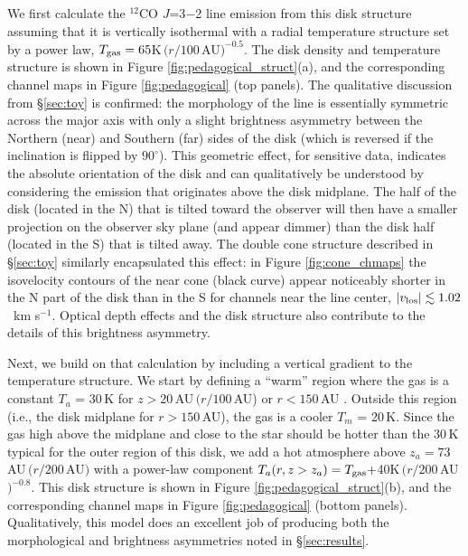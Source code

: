 We first calculate the $^{12}$CO $J$=3$-$2 line emission from this disk 
structure assuming that it is vertically isothermal with a radial temperature 
structure set by a power law, $T_{\rm gas} = 65$K\,$(r/100$\,AU$)^{-0.5}$.  The 
disk density and temperature structure is shown in Figure 
\ref{fig:pedagogical_struct}(a), and the corresponding channel maps in Figure 
\ref{fig:pedagogical} (top panels).  The qualitative discussion from 
\S\ref{sec:toy} is confirmed: the morphology of the line is essentially 
symmetric across the major axis with only a slight brightness asymmetry between 
the Northern (near) and Southern (far) sides of the disk (which is reversed if 
the inclination is flipped by $90^\circ$).  This geometric effect, for 
sensitive data, indicates the absolute orientation of the disk and can
qualitatively be understood by considering the emission that originates above 
the disk midplane.  The half of the disk (located in the N) that is tilted 
toward the observer will then have a smaller projection on the observer sky 
plane (and appear dimmer) than the disk half (located in the S) that is tilted 
away.  The double cone structure described in \S\ref{sec:toy} similarly
encapsulated this effect: in Figure \ref{fig:cone_chmaps} the isovelocity 
contours of the near cone (black curve) appear noticeably shorter in the N part
of the disk than in the S for channels near the line center, $|v_{\rm los}| 
\lesssim 1.02$\, km s$^{-1}$.  Optical depth effects and the disk
structure also contribute to the details of this brightness asymmetry.

Next, we build on that calculation by including a vertical gradient to the
temperature structure.  We start by defining a ``warm'' region where the gas is 
a constant $T_ a$ = 30\,K for $z > 20$\,AU\,$(r/100$\,AU) or $r < 150$\,AU 
\citep[the freezeout radius for this disk][]{qi11}.  Outside this 
region (i.e., the disk midplane for $r > 150$\,AU), the gas is a cooler 
$T_ m$ = 20\,K.  Since the gas high above the midplane and close to the star
should be hotter than the 30\,K typical for the outer region of this disk,
we add a hot atmosphere above $z_a = 73$AU\,$(r/200$\,AU$)$ with a power-law 
component $T_a(r,z>z_a) = T_{\rm gas} + $40K\,$(r/200$\,AU$)^{-0.8}$.  
This disk structure is shown in Figure \ref{fig:pedagogical_struct}(b), and the 
corresponding channel maps in Figure \ref{fig:pedagogical} (bottom panels).  
Qualitatively, this model does an excellent job of producing both the 
morphological and brightness asymmetries noted in \S\ref{sec:results}.  

